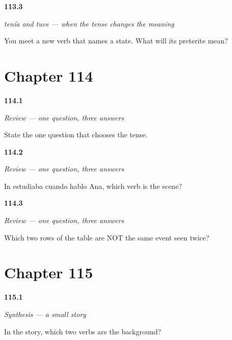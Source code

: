 \noindent\begin{minipage}[t]{\linewidth}
\raggedright
\hypertarget{review-ES-C48-tenia-tuve-rule}{\textbf{113.3}} \emph{tenía and tuve — when the tense changes the meaning}\par
\small You meet a new verb that names a state. What will its preterite mean?
\end{minipage}\par\medskip

\section*{Chapter 114}

\noindent\begin{minipage}[t]{\linewidth}
\raggedright
\hypertarget{review-ES-C48-repaso-dos-pasados-question}{\textbf{114.1}} \emph{Review — one question, three answers}\par
\small State the one question that chooses the tense.
\end{minipage}\par\medskip

\noindent\begin{minipage}[t]{\linewidth}
\raggedright
\hypertarget{review-ES-C48-repaso-dos-pasados-scene}{\textbf{114.2}} \emph{Review — one question, three answers}\par
\small In estudiaba cuando hablo Ana, which verb is the scene?
\end{minipage}\par\medskip

\noindent\begin{minipage}[t]{\linewidth}
\raggedright
\hypertarget{review-ES-C48-repaso-dos-pasados-state}{\textbf{114.3}} \emph{Review — one question, three answers}\par
\small Which two rows of the table are NOT the same event seen twice?
\end{minipage}\par\medskip

\section*{Chapter 115}

\noindent\begin{minipage}[t]{\linewidth}
\raggedright
\hypertarget{review-ES-C48-sintesis-una-historia-layers}{\textbf{115.1}} \emph{Synthesis — a small story}\par
\small In the story, which two verbs are the background?
\end{minipage}\par\medskip

